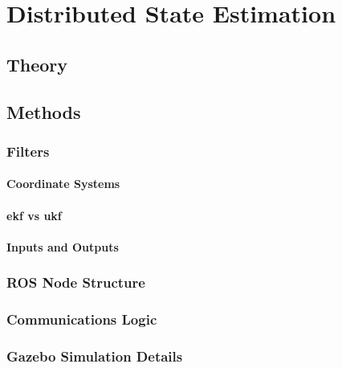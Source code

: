 \documentclass[thesis.tex]{subfile}
\begin{document}
\chapter{Distributed State Estimation} \label{Distributed State Estimation}
\section{Theory}
\section{Methods}
\subsection{Filters}
\subsubsection{Coordinate Systems}
\subsubsection{\gls{ekf} vs \gls{ukf}}
\subsubsection{Inputs and Outputs}
\subsection{ROS Node Structure}
\subsection{Communications Logic}
\subsection{Gazebo Simulation Details}
\end{document}
